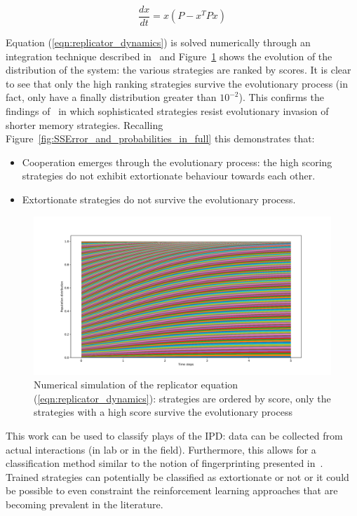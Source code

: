 \documentclass[a4paper]{article}
\begin{document}
\begin{equation}\label{eqn:replicator_dynamics}
    \frac{dx}{dt} = x(P-x^TP x)
\end{equation}

Equation (\ref{eqn:replicator_dynamics}) is solved numerically through an
integration technique described in~\cite{Petzold1983} and
Figure~\ref{fig:replicator_dynamics} shows the evolution of the distribution of
the system: the various strategies are ranked by scores. It is clear to see that
only the high ranking strategies survive the evolutionary process (in fact,
only 
have a finally distribution greater than \(10 ^ {-2}\)). This confirms the
findings of~\cite{Moran1707} in which sophisticated strategies resist
evolutionary invasion of shorter memory strategies. Recalling
Figure~\ref{fig:SSError_and_probabilities_in_full} this demonstrates that:

\begin{itemize}
    \item Cooperation emerges through the evolutionary process: the high scoring
        strategies do not exhibit extortionate behaviour towards each other.
    \item Extortionate strategies do not survive the evolutionary process.
\end{itemize}

\begin{figure}[!htbp]
    \centering
    \includegraphics[width=.8\textwidth]{./assets/img/replicator_dynamics/main.pdf}
    \caption{Numerical simulation of the replicator equation
    (\ref{eqn:replicator_dynamics}): strategies are ordered by score, only the strategies with a high score survive the evolutionary process}
    \label{fig:replicator_dynamics}
\end{figure}

This work can be used to classify plays of the IPD\@: data can be collected from
actual interactions (in lab or in the field). Furthermore, this allows for a
classification method similar to the notion of fingerprinting presented
in~\cite{Ashlock2008}. Trained strategies can potentially be classified as
extortionate or not or it could be possible to even constraint the reinforcement
learning approaches that are becoming prevalent in the literature.
\end{document}
